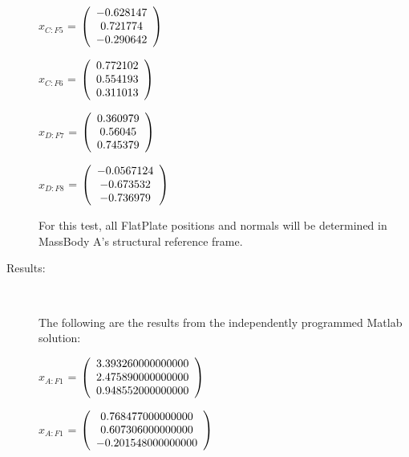 \begin{description}
$\hat{x}_{C:F5}$ = $\left( \begin{array} {ccc}  -0.628147 \\   0.721774 \\  -0.290642
\end{array} \right)\\ \\$

$\hat{x}_{C:F6}$ = $\left( \begin{array} {ccc}   0.772102 \\   0.554193 \\   0.311013
\end{array} \right)\\ \\$

$\hat{x}_{D:F7}$ = $\left( \begin{array} {ccc}   0.360979 \\    0.56045 \\   0.745379
\end{array} \right)\\ \\$

$\hat{x}_{D:F8}$ = $\left( \begin{array} {ccc} -0.0567124 \\  -0.673532 \\  -0.736979
\end{array} \right)\\ \\$

For this test, all FlatPlate positions and normals will be determined in
MassBody A's structural reference frame.

\item[Results:] \ \newline

The following are the results from the independently programmed Matlab solution:

$x_{A:F1}$  = $\left( \begin{array} {ccc} 3.393260000000000 \\ 2.475890000000000 \\ 0.948552000000000
\end{array} \right)\\ \\$

$\hat{x}_{A:F1}$  = $\left( \begin{array} {ccc} 0.768477000000000 \\ 0.607306000000000 \\ -0.201548000000000
\end{array} \right)\\ \\$


\end{description}
